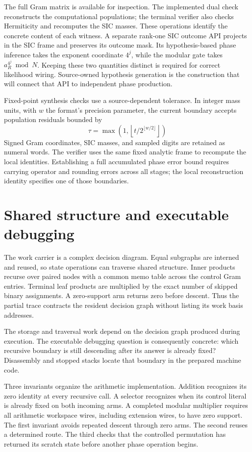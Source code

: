\documentclass[12pt]{article}
\begin{document}
The full Gram matrix is available for inspection. The implemented dual check reconstructs the computational populations; the terminal verifier also checks Hermiticity and recomputes the SIC masses. These operations identify the concrete content of each witness. A separate rank-one SIC outcome API projects in the SIC frame and preserves its outcome mask. Its hypothesis-based phase inference takes the exponent coordinate $4^j$, while the modular gate takes $a_R^{4^j}\bmod N$. Keeping these two quantities distinct is required for correct likelihood wiring. Source-owned hypothesis generation is the construction that will connect that API to independent phase production.

Fixed-point synthesis checks use a source-dependent tolerance. In integer mass units, with $w$ the format's precision parameter, the current boundary accepts population residuals bounded by
\[
\tau=\max\!\left(1,\left\lfloor t/2^{\lfloor w/2\rfloor}\right\rfloor\right)
\]
Signed Gram coordinates, SIC masses, and sampled digits are retained as numeral words. The verifier uses the same fixed analytic frame to recompute the local identities. Establishing a full accumulated phase error bound requires carrying operator and rounding errors across all stages; the local reconstruction identity specifies one of those boundaries.

\section*{Shared structure and executable debugging}

The work carrier is a complex decision diagram. Equal subgraphs are interned and reused, so state operations can traverse shared structure. Inner products recurse over paired nodes with a common memo table across the control Gram entries. Terminal leaf products are multiplied by the exact number of skipped binary assignments. A zero-support arm returns zero before descent. Thus the partial trace contracts the resident decision graph without listing its work basis addresses.

The storage and traversal work depend on the decision graph produced during execution. The executable debugging question is consequently concrete: which recursive boundary is still descending after its answer is already fixed? Disassembly and stopped stacks locate that boundary in the prepared machine code.

Three invariants organize the arithmetic implementation. Addition recognizes its zero identity at every recursive call. A selector recognizes when its control literal is already fixed on both incoming arms. A completed modular multiplier requires all arithmetic workspace wires, including extension wires, to have zero support. The first invariant avoids repeated descent through zero arms. The second reuses a determined route. The third checks that the controlled permutation has returned its scratch state before another phase operation begins.
\end{document}
